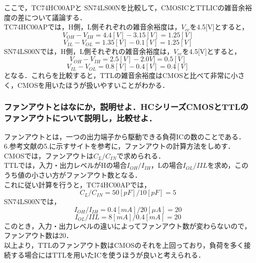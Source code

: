 \documentclass[10pt, a4j, dvipdfmx]{jarticle}
\begin{document}
ここで，TC74HC00APと	SN74LS00Nを比較して，CMOSICとTTLICの雑音余裕度の差について議論する．\\
TC74HC00APでは，H側，L側それぞれの雑音余裕度は，$V_{cc}$を4.5[V]とすると，
\begin{equation}
	V_{OH} - V_{IH} = 4.4[V] - 3.15[V] = 1.25[V]
\end{equation}
\begin{equation}
	V_{IL} - V_{OL} =  1.35[V] - 0.1[V] = 1.25[V]
\end{equation}
	SN74LS00Nでは，H側，L側それぞれの雑音余裕度は，$V_{cc}$を4.5[V]とすると，
\begin{equation}
	V_{OH} - V_{IH} = 2.5[V] - 2.0V] = 0.5[V]
\end{equation}
\begin{equation}
	V_{IL} - V_{OL} =  0.8[V] - 0.4[V] = 0.4[V]
\end{equation}
となる．これらを比較すると，TTLの雑音余裕度はCMOSと比べて非常に小さく，CMOSを用いたほうが扱いやすいことがわかる．

\subsubsection{ファンアウトとはなにか，説明せよ．HCシリーズCMOSとTTLのファンアウトについて説明し，比較せよ．}
ファンアウトとは，一つの出力端子から駆動できる負荷ICの数のことである．
6.参考文献の5.に示すサイトを参考に，ファンアウトの計算方法をしめす．\\
CMOSでは，ファンアウトは$C_L / C_{IN}$で求められる．\\
TTLでは，入力・出力レベルがHの場合$I_{OH} / I_{IH}$，Lの場合$I_{OL} / I{IL}$を求め，このうち値の小さい方がファンアウト数となる．\\
これに従い計算を行うと，TC74HC00APでは，　
\begin{equation}
	C_L / C_{IN} = 50[pF] / 10[pF] = 5
\end{equation}
SN74LS00Nでは，
\begin{equation}
	I_{OH} / I_{IH} = 0.4[mA] / 20 [\mu A] = 20
\end{equation}
\begin{equation}
	I_{OL} / I{IL} = 8[mA] / 0.4[mA] = 20
\end{equation}
このとき，入力・出力レベルの違いによってファンアウト数が変わらないので，ファンアウト数は20．\\
以上より，TTLのファンアウト数はCMOSのそれを上回っており，負荷を多く接続する場合にはTTLを用いたICを使うほうが良いと考えられる．
\end{document}
